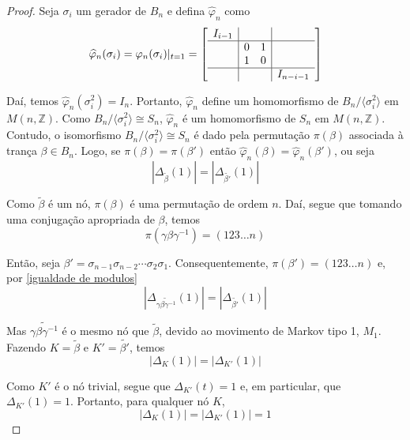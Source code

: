 \documentclass[a4paper,portuguese,11pt,twoside, leqno]{book}
\theoremstyle{definition}
\begin{document}
	\begin{proof}
		Seja $\sigma_i$ um gerador de $B_n$ e defina $\widehat{\varphi}_n$ como
		\begin{equation*}
		\widehat{\varphi}_n(\sigma_i) = \varphi_n(\sigma_i)|_{t=1} = \left[ \begin{array}{c|cc|c}
		I_{i-1} & & & \\
		\hline
		& 0 & 1 & \\
		& 1 & 0 & \\
		\hline 
		& & & I_{n-i-1}
		\end{array}\right] 
		\end{equation*}
		\par\vspace{0.3cm} Daí, temos $\widehat{\varphi}_n(\sigma_i^2) = I_n$. Portanto, $\widehat{\varphi}_n$ define um homomorfismo de $B_n/\langle \sigma_i^2 \rangle$ em $M(n, \mathbb{Z})$. Como $B_n/\langle \sigma_i^2 \rangle\cong S_n$, $\widehat{\varphi}_n$ é um homomorfismo de $S_n$ em $M(n,\mathbb{Z})$. Contudo, o isomorfismo $B_n/\langle \sigma_i^2 \rangle\cong S_n$ é dado pela permutação $\pi(\beta)$ associada à trança $\beta\in B_n$. Logo, se $\pi(\beta) = \pi(\beta')$ então $\widehat{\varphi}_n(\beta) = \widehat{\varphi}_n(\beta')$, ou seja
		\begin{equation}
		\label{igualdade de modulos}
		|\Delta_{\widetilde{\beta}}(1)| = |\Delta_{\widetilde{\beta'}}(1)|
		\end{equation}
		\par\vspace{0.3cm} Como $\widetilde{\beta}$ é um nó, $\pi(\beta)$ é uma permutação de ordem $n$. Daí, segue que tomando uma conjugação apropriada de $\beta$, temos
		\begin{equation*}
		\pi(\gamma\beta\gamma^{-1}) = (123\dots n)
		\end{equation*}
		\par\vspace{0.3cm} Então, seja $\beta' = \sigma_{n-1}\sigma_{n-2}\cdots\sigma_2\sigma_1$. Consequentemente, $\pi(\beta') = (123\dots n)$ e, por \eqref{igualdade de modulos}
		\begin{equation*}
		| \Delta_{\widetilde{\gamma\beta\gamma^{-1}}}(1) | = | \Delta_{\widetilde{\beta'}}(1) |
		\end{equation*}
		\par\vspace{0.3cm} Mas $\widetilde{\gamma\beta\gamma^{-1}}$ é o mesmo nó que $\widetilde{\beta}$, devido ao movimento de Markov tipo 1, $M_1$. Fazendo $K = \widetilde{\beta}$ e $K' = \widetilde{\beta'}$, temos
		\begin{equation*}
		|\Delta_K(1)| = |\Delta_{K'}(1)|
		\end{equation*} 
		\par\vspace{0.3cm} Como $K'$ é o nó trivial, segue que $\Delta_{K'}(t) = 1$ e, em particular, que $\Delta_{K'}(1) = 1$. Portanto, para qualquer nó $K$,
		\begin{equation*}
		|\Delta_K(1)| = |\Delta_{K'}(1)| = 1
		\end{equation*}
	\end{proof}
\end{document}

